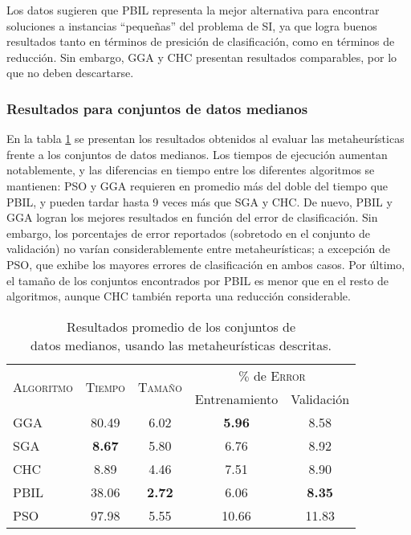 Los datos sugieren que PBIL representa la mejor alternativa para encontrar soluciones a instancias ``pequeñas'' del problema de SI, ya que logra buenos resultados tanto en términos de presición de clasificación, como en términos de reducción. Sin embargo, GGA y CHC presentan resultados comparables, por lo que no deben descartarse.

\subsubsection{Resultados para conjuntos de datos medianos}

En la tabla \ref{res-med} se presentan los resultados obtenidos al evaluar las metaheurísticas frente a los conjuntos de datos medianos. Los tiempos de ejecución aumentan notablemente, y las diferencias en tiempo entre los diferentes algoritmos se mantienen: PSO y GGA requieren en promedio más del doble del tiempo que PBIL, y pueden tardar hasta 9 veces más que SGA y CHC. De nuevo, PBIL y GGA logran los mejores resultados en función del error de clasificación. Sin embargo, los porcentajes de error reportados (sobretodo en el conjunto de validación) no varían considerablemente entre metaheurísticas; a excepción de PSO, que exhibe los mayores errores de clasificación en ambos casos. Por último, el tamaño de los conjuntos encontrados por PBIL es menor que en el resto de algoritmos, aunque CHC también reporta una reducción considerable.

\begin{table}[h!]
\centering
\begin{tabular}{l c c c c}
\hline
\multirow{2}{*}{\textsc{Algoritmo}}
	& \multirow{2}{*}{\textsc{Tiempo}}
	& \multirow{2}{*}{\textsc{Tamaño}}
	& \multicolumn{2}{c}{$\%$ de \textsc{Error}} \\\cline{4-5}
 & & & \scriptsize{Entrenamiento} & \scriptsize{Validación} \\
\hline
\hline
GGA  & 80.49 & 6.02 &  \textbf{5.96} &  8.58 \\
SGA  & \textbf{8.67} & 5.80 &  6.76 &  8.92 \\
CHC  &  8.89 & 4.46 &  7.51 &  8.90 \\
PBIL & 38.06 & \textbf{2.72} &  6.06 &  \textbf{8.35} \\
PSO  & 97.98 & 5.55 & 10.66 & 11.83 \\
\hline
\end{tabular}
\caption[Resultados de metaheurísticas usando conjuntos de datos medianos]{Resultados promedio de los conjuntos de\\datos medianos, usando las metaheurísticas descritas.}
\label{res-med}
\end{table}

